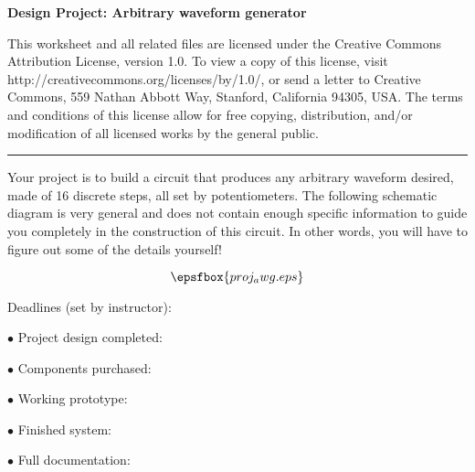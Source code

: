 
\centerline{\bf Design Project: Arbitrary waveform generator} \bigskip 
 
This worksheet and all related files are licensed under the Creative Commons Attribution License, version 1.0.  To view a copy of this license, visit http://creativecommons.org/licenses/by/1.0/, or send a letter to Creative Commons, 559 Nathan Abbott Way, Stanford, California 94305, USA.  The terms and conditions of this license allow for free copying, distribution, and/or modification of all licensed works by the general public.

\bigskip 

\hrule

\vskip 10pt

Your project is to build a circuit that produces any arbitrary waveform desired, made of 16 discrete steps, all set by potentiometers.  The following schematic diagram is very general and does not contain enough specific information to guide you completely in the construction of this circuit.  In other words, you will have to figure out some of the details yourself!

$$\epsfbox{proj_awg.eps}$$

\vskip 10pt

\noindent
Deadlines (set by instructor):

\medskip
\item{$\bullet$} Project design completed: 
\item{$\bullet$} Components purchased:
\item{$\bullet$} Working prototype:
\item{$\bullet$} Finished system:
\item{$\bullet$} Full documentation:
\medskip



